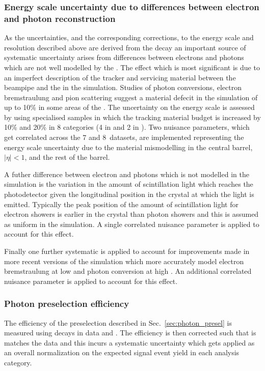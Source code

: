 \subsubsection{Energy scale uncertainty due to differences between electron and photon reconstruction}
As the uncertainties, and the corresponding corrections, to the energy scale and resolution described above are derived from the \Zee decay an important source of systematic uncertainty arises from differences between electrons and photons which are not well modelled by the \MC. The effect which is most significant is due to an imperfect description of the tracker and servicing material between the beampipe and the \ECAL in the simulation. Studies of photon conversions, electron bremstraulung and pion scattering suggest a material defecit in the simulation of up to 10\% in some areas of the \ECAL. The uncertainty on the energy scale is assessed by using specialised \MC samples in which the tracking material budget is increased by 10\% and 20\% in 8 categories (4 in \eta and 2 in \rnine). Two nuisance parameters, which get correlated across the 7 and 8~\TeV datasets, are implemented representing the energy scale uncertainty due to the material mismodelling in the central barrel, $|\eta|<1$, and the rest of the barrel.

A futher difference between electron and photons which is not modelled in the simulation is the variation in the amount of scintillation light which reaches the photodetector given the longitudinal position in the crystal at which the light is emitted. Typically the peak position of the amount of scintillation light for electron showers is earlier in the crystal than photon showers and this is assumed as uniform in the simulation. A single correlated nuisance parameter is applied to account for this effect.

Finally one further systematic is applied to account for improvements made in more recent versions of the simulation which more accurately model electron bremstraulung at low \pT and photon conversion at high \pT. An additional correlated nuisance parameter is applied to account for this effect.

\subsubsection{Photon preselection efficiency}

The efficiency of the preselection described in Sec.~\ref{sec:photon_presel} is measured using \Zee decays in data and \MC. The \MC efficiency is then corrected such that is matches the data and this incurs a systematic uncertainty which gets applied as an overall normalization on the expected signal event yield in each analysis category. 

